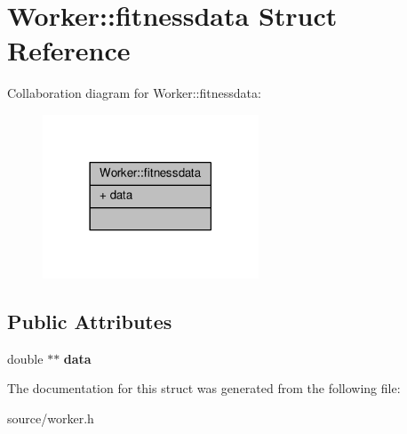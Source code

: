 \hypertarget{structWorker_1_1fitnessdata}{}\section{Worker\+:\+:fitnessdata Struct Reference}
\label{structWorker_1_1fitnessdata}


Collaboration diagram for Worker\+:\+:fitnessdata\+:
\nopagebreak
\begin{figure}[H]
\begin{center}
\leavevmode
\includegraphics[width=182pt]{structWorker_1_1fitnessdata__coll__graph}
\end{center}
\end{figure}
\subsection*{Public Attributes}
\begin{DoxyCompactItemize}
\item 
\hypertarget{structWorker_1_1fitnessdata_a3baa133e61e81814d5000a4018a3bc92}{}double $\ast$$\ast$ {\bfseries data}\label{structWorker_1_1fitnessdata_a3baa133e61e81814d5000a4018a3bc92}

\end{DoxyCompactItemize}


The documentation for this struct was generated from the following file\+:\begin{DoxyCompactItemize}
\item 
source/worker.\+h\end{DoxyCompactItemize}
